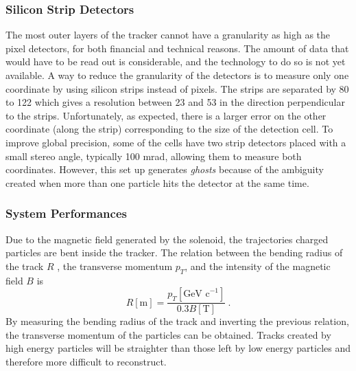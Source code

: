   \subsubsection{Silicon Strip Detectors}
  \label{sec:lhc_and_cms__silicon_strip_detectors}

    The most outer layers of the tracker cannot have a granularity as high as the pixel detectors, for both financial and technical reasons. The amount of data that would have to be read out is considerable, and the technology to do so is not yet available. A way to reduce the granularity of the detectors is to measure only one coordinate by using silicon strips instead of pixels. The strips are separated by 80 to 122 \um{} which gives a resolution between 23 \um{} and 53 \um{} in the direction perpendicular to the strips. Unfortunately, as expected, there is a larger error on the other coordinate (along the strip) corresponding to the size of the detection cell. To improve global precision, some of the cells have two strip detectors placed with a small stereo angle, typically 100 mrad, allowing them to measure both coordinates. However, this set up generates \emph{ghosts} because of the ambiguity created when more than one particle hits the detector at the same time.

  \subsubsection{System Performances}
  \label{sec:lhc_and_cms__tracker_system_performances}

    Due to the magnetic field generated by the solenoid, the trajectories charged particles are bent inside the tracker. The relation between the bending radius of the track $ R $ , the transverse momentum $ p_T $, and the intensity of the magnetic field $ B $ is
    \begin{equation}
      R[\mbox{m}] = \frac{p_T[\mbox{GeV c}^{-1}]}{0.3 B[\mbox{T}]} \ .
      \label{eq:lhc_and_cms__radius_to_momentum_relation}
    \end{equation}
    By measuring the bending radius of the track and inverting the previous relation, the transverse momentum of the particles can be obtained. Tracks created by high energy particles will be straighter than those left by low energy particles and therefore more difficult to reconstruct. \\

